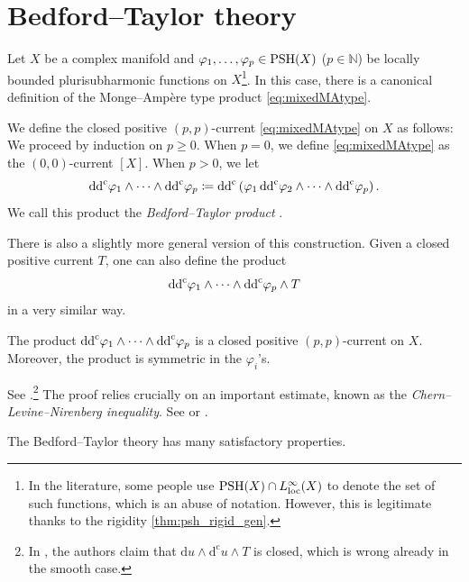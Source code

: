 \section{Bedford--Taylor theory}\label{sec:BTtheory}
Let $X$ be a complex manifold and $\varphi_1,\ldots,\varphi_p\in \mathrm{PSH}(X)$ ($p\in \mathbb{N}$) be locally bounded plurisubharmonic functions on $X$\footnote{In the literature, some people use $\mathrm{PSH}(X)\cap L^{\infty}_{\mathrm{loc}}(X)$ to denote the set of such functions, which is an abuse of notation. However, this is legitimate thanks to the rigidity \cref{thm:psh_rigid_gen}.}. In this case, there is a canonical definition of the Monge--Amp\`ere type product \eqref{eq:mixedMAtype}.
\begin{definition}\label{def:npp:L22}
    We define the closed positive $(p,p)$-current \eqref{eq:mixedMAtype} on $X$ as follows: We proceed by induction on $p\geq 0$. When $p=0$, we define \eqref{eq:mixedMAtype} as the $(0,0)$-current $[X]$. When $p>0$, we let
    \[
    \mathrm{dd}^{\mathrm{c}} \varphi_1\wedge \cdots \wedge \mathrm{dd}^{\mathrm{c}}\varphi_p\coloneqq \mathrm{dd}^{\mathrm{c}} \left( \varphi_1\,\mathrm{dd}^{\mathrm{c}} \varphi_2 \wedge \cdots \wedge \mathrm{dd}^{\mathrm{c}}\varphi_p \right).
    \]
    We call this product the \emph{Bedford--Taylor product} .
\end{definition}

\begin{remark}\label{rmk:extensionBT}
There is also a slightly more general version of this construction. Given a closed positive current $T$, one can also define the product
\[
\mathrm{dd}^{\mathrm{c}} \varphi_1\wedge \cdots \wedge \mathrm{dd}^{\mathrm{c}}\varphi_p \wedge T
\]
in a very similar way.
\end{remark}


\begin{proposition}\label{prop:npp:L40}
    The product $\mathrm{dd}^{\mathrm{c}} \varphi_1\wedge \cdots \wedge \mathrm{dd}^{\mathrm{c}}\varphi_p$ is a closed positive $(p,p)$-current on $X$. Moreover, the product is symmetric in the $\varphi_i$'s.
\end{proposition}
See \cite[Proposition~3.3, Corollary~3.12]{GZ17}.\footnote{In \cite[Proposition~3.3]{GZ17}, the authors claim that $\mathrm{d}u\wedge \mathrm{d}^{\mathrm{c}}u\wedge T$ is closed, which is wrong already in the smooth case.} The proof relies crucially on an important estimate, known as the \emph{Chern--Levine--Nirenberg inequality}. See \cite{CLN69} or \cite[Theorem~3.9]{GZ17}.

The Bedford--Taylor theory has many satisfactory properties.

